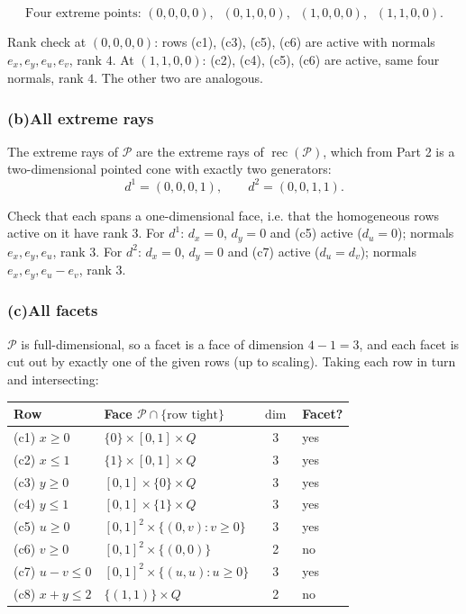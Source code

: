 \documentclass[11pt]{article}
\DeclareMathOperator{\rec}{rec}
\DeclareMathOperator{\dimop}{dim}
\theoremstyle{definition}
\theoremstyle{plain}
\begin{document}
\[
  \boxed{\;
  \text{Four extreme points: }
  (0,0,0,0),\;\; (0,1,0,0),\;\; (1,0,0,0),\;\; (1,1,0,0). \;}
\]

Rank check at $(0,0,0,0)$: rows (c1), (c3), (c5), (c6) are active with
normals $e_x, e_y, e_u, e_v$, rank $4$. At $(1,1,0,0)$: (c2), (c4),
(c5), (c6) are active, same four normals, rank $4$. The other two are
analogous.

\subsubsection*{(b)\quad All extreme rays}

The extreme rays of $\mathcal{P}$ are the extreme rays of
$\rec(\mathcal{P})$, which from Part 2 is a two-dimensional pointed cone
with exactly two generators:
\[
  \boxed{\; d^1 = (0,0,0,1), \qquad d^2 = (0,0,1,1). \;}
\]

Check that each spans a one-dimensional face, i.e. that the homogeneous
rows active on it have rank $3$. For $d^1$: $d_x = 0$, $d_y = 0$ and
(c5) active ($d_u = 0$); normals $e_x, e_y, e_u$, rank $3$. For $d^2$:
$d_x = 0$, $d_y = 0$ and (c7) active ($d_u = d_v$); normals
$e_x, e_y, e_u - e_v$, rank $3$.

\subsubsection*{(c)\quad All facets}

$\mathcal{P}$ is full-dimensional, so a facet is a face of dimension
$4 - 1 = 3$, and each facet is cut out by exactly one of the given rows
(up to scaling). Taking each row in turn and intersecting:

\begin{center}
\begin{tabular}{@{}llcl@{}}
\toprule
Row & Face $\mathcal{P} \cap \{\text{row tight}\}$ & $\dimop$ & Facet? \\
\midrule
(c1) $x \ge 0$     & $\{0\} \times [0,1] \times Q$ & 3 & yes \\
(c2) $x \le 1$     & $\{1\} \times [0,1] \times Q$ & 3 & yes \\
(c3) $y \ge 0$     & $[0,1] \times \{0\} \times Q$ & 3 & yes \\
(c4) $y \le 1$     & $[0,1] \times \{1\} \times Q$ & 3 & yes \\
(c5) $u \ge 0$     & $[0,1]^2 \times \{(0,v) : v \ge 0\}$ & 3 & yes \\
(c6) $v \ge 0$     & $[0,1]^2 \times \{(0,0)\}$ & 2 & no \\
(c7) $u - v \le 0$ & $[0,1]^2 \times \{(u,u) : u \ge 0\}$ & 3 & yes \\
(c8) $x + y \le 2$ & $\{(1,1)\} \times Q$ & 2 & no \\
\bottomrule
\end{tabular}
\end{center}
\end{document}

